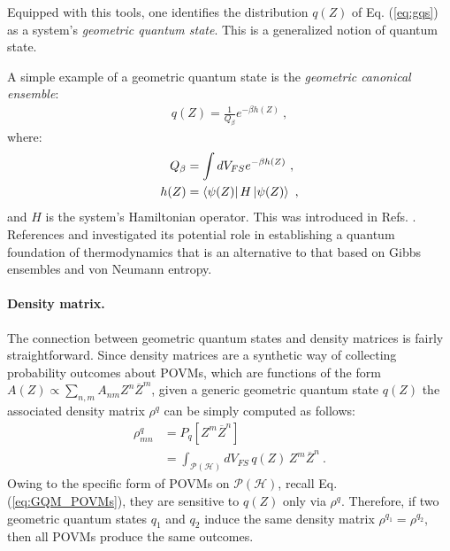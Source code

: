\documentclass[draft,nofootinbib,pre,twocolumn,showpacs,showkeys,preprintnumbers,floatfix]{revtex4-1}
\newcommand{\1}{\mathbbm{1}}
\newcommand{\intP}{\int_{\mathcal{P}(\mathcal{H})} \!\!\!\!\!\!\!\!\!}
\begin{document}
Equipped with this tools, one identifies the distribution $q(Z)$ of Eq.
(\ref{eq:gqs}) as a system's \emph{geometric quantum state}. This is a
generalized notion of quantum state.

A simple example of a geometric quantum state is the 
\emph{geometric canonical ensemble}:
\begin{align*}
q(Z) = \frac{1}{Q_\beta} e^{-\beta h(Z)}
  ~,
\end{align*}
where:
\begin{align*}
  Q_\beta & = \int dV_{FS} e^{-\beta h(Z)} ~, \\
  h(Z) & = \bra{\psi(Z)}H\ket{\psi(Z)} ~,
\end{align*}
and $H$ is the system's Hamiltonian operator. This was introduced in 
Refs. \cite{Brody1998}. References \cite{Brody2016} and \cite{Anza20b} 
investigated its potential role in establishing a quantum foundation of
thermodynamics that is an alternative to that based on Gibbs ensembles and von
Neumann entropy. 

\paragraph*{Density matrix.}
The connection between geometric quantum states and density matrices is
fairly straightforward. Since density matrices are a synthetic way of collecting
probability outcomes about POVMs, which are functions of the 
form $A(Z) \propto \sum_{n,m}A_{n m} Z^n \overline{Z}^m$, 
given a generic geometric quantum state $q(Z)$ the associated density matrix $\rho^q$ can be 
simply computed as follows:
\begin{align}
\rho^q_{mn} & = P_q[Z^m \overline{Z}^n] \nonumber \\
  & = \intP dV_{FS} \, q(Z)  \, Z^m \overline{Z}^n
  ~.
\label{eq:densitymatrix}
\end{align}
Owing to the specific form of POVMs on $\mathcal{P}(\mathcal{H})$, recall Eq. (\ref{eq:GQM_POVMs}), they
are sensitive to $q(Z)$ only via $\rho^q$. Therefore, if two geometric quantum states 
$q_1$ and $q_2$ induce the same density matrix $\rho^{q_1} = \rho^{q_2}$, then all POVMs
produce the same outcomes.
\end{document}
